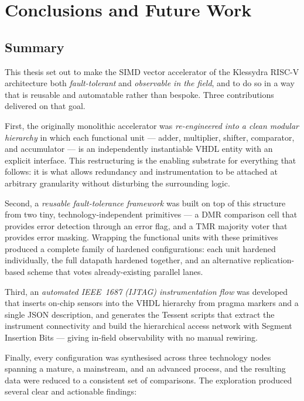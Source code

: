 \chapter{Conclusions and Future Work}
\label{ch:conclusion}

\section{Summary}

This thesis set out to make the SIMD vector accelerator of the Klessydra RISC-V
architecture both \emph{fault-tolerant} and \emph{observable in the field}, and
to do so in a way that is reusable and automatable rather than bespoke. Three
contributions delivered on that goal.

First, the originally monolithic accelerator was \emph{re-engineered into a clean
modular hierarchy} in which each functional unit --- adder, multiplier, shifter,
comparator, and accumulator --- is an independently instantiable VHDL entity with
an explicit interface. This restructuring is the enabling substrate for
everything that follows: it is what allows redundancy and instrumentation to be
attached at arbitrary granularity without disturbing the surrounding logic.

Second, a \emph{reusable fault-tolerance framework} was built on top of this
structure from two tiny, technology-independent primitives --- a DMR comparison
cell that provides error detection through an error flag, and a TMR majority
voter that provides error masking. Wrapping the functional units with these
primitives produced a complete family of hardened configurations: each unit
hardened individually, the full datapath hardened together, and an alternative
replication-based scheme that votes already-existing parallel lanes.

Third, an \emph{automated IEEE~1687 (IJTAG) instrumentation flow} was developed
that inserts on-chip sensors into the VHDL hierarchy from pragma markers and a
single JSON description, and generates the Tessent scripts that extract the
instrument connectivity and build the hierarchical access network with Segment
Insertion Bits --- giving in-field observability with no manual rewiring.

Finally, every configuration was synthesised across three technology nodes
spanning a mature, a mainstream, and an advanced process, and the resulting data
were reduced to a consistent set of comparisons. The exploration produced several
clear and actionable findings:

